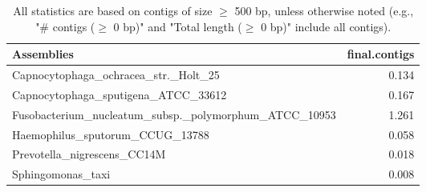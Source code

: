 \documentclass[12pt,a4paper]{article}
\begin{document}
\begin{table}[ht]
\begin{center}
\caption{All statistics are based on contigs of size $\geq$ 500 bp, unless otherwise noted (e.g., "\# contigs ($\geq$ 0 bp)" and "Total length ($\geq$ 0 bp)" include all contigs).}
\begin{tabular}{|l*{1}{|r}|}
\hline
Assemblies & final.contigs \\ \hline
Capnocytophaga\_ochracea\_str.\_Holt\_25 & 0.134 \\ \hline
Capnocytophaga\_sputigena\_ATCC\_33612 & 0.167 \\ \hline
Fusobacterium\_nucleatum\_subsp.\_polymorphum\_ATCC\_10953 & 1.261 \\ \hline
Haemophilus\_sputorum\_CCUG\_13788 & 0.058 \\ \hline
Prevotella\_nigrescens\_CC14M & 0.018 \\ \hline
Sphingomonas\_taxi & 0.008 \\ \hline
\end{tabular}
\end{center}
\end{table}
\end{document}
